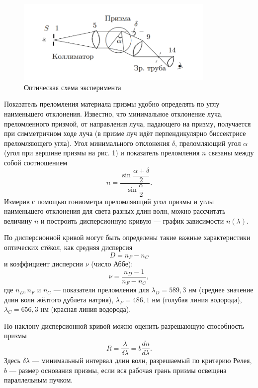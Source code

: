 \documentclass[a4paper, 12pt]{article}%
\begin{document}
	\begin{figure}[H]
		\begin{center}
			\includegraphics[width = 0.85\textwidth]{1.png}
			\caption{Оптическая схема эксперимента}
		\end{center}
	\end{figure}

	Показатель преломления материала призмы удобно определять по углу наименьшего отклонения. Известно, что минимальное отклонение луча, преломленного призмой, от направления луча, падающего на призму, получается при симметричном ходе луча (в призме луч идёт перпендикулярно биссектрисе преломляющего угла). Угол минимального отклонения $\delta$, преломляющий угол $\alpha$ (угол при вершине призмы на рис. 1) и показатель преломления $n$ связаны между собой соотношением
	\begin{equation}
		n=\dfrac{\sin\dfrac{\alpha+\delta}{2}}{\sin\dfrac{\alpha}{2}}.
	\end{equation}
	Измерив с помощью гониометра преломляющий угол призмы и углы наименьшего отклонения для света разных длин волн, можно рассчитать величину $n$ и построить дисперсионную кривую --- график зависимости $n(\lambda)$. 
	
	По дисперсионной кривой могут быть определены такие важные характеристики оптических стёкол, как средняя дисперсия
	\begin{equation}
		D = n_F - n_C
	\end{equation}
	и коэффициент дисперсии $\nu$ (число Аббе):
	\begin{equation}
		\nu = \dfrac{n_D - 1}{n_F - n_C},
	\end{equation}
	где $n_D, n_F$ и $n_C$ --- показатели преломления для $\lambda_D = 589{,}3$ нм (среднее значение длин волн жёлтого дублета натрия), $\lambda_F = 486{,}1$ нм (голубая линия водорода), $\lambda_C = 656{,}3$ нм (красная линия водорода).
	
	По наклону дисперсионной кривой можно оценить разрешающую
	способность призмы
	\begin{equation}
		R = \dfrac{\lambda}{\delta\lambda} = b\dfrac{dn}{d\lambda}.
	\end{equation}
	Здесь $\delta\lambda$ --- минимальный интервал длин волн, разрешаемый по критерию Релея, $b$ --- размер основания призмы, если вся рабочая грань призмы освещена параллельным пучком.\\
	
\end{document}
